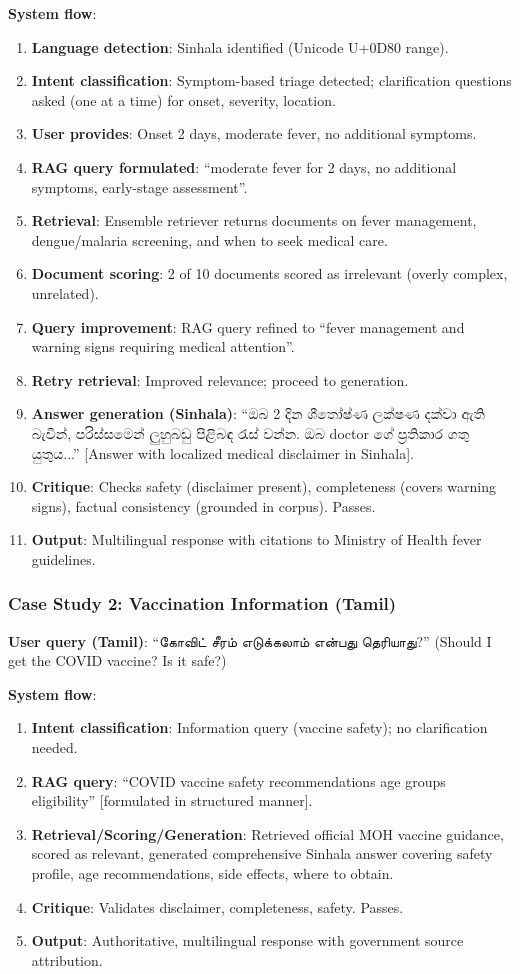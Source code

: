 \documentclass[11pt,a4paper]{article}
\begin{document}
\textbf{System flow}:
\begin{enumerate}
    \item \textbf{Language detection}: Sinhala identified (Unicode U+0D80 range).
    \item \textbf{Intent classification}: Symptom-based triage detected; clarification questions asked (one at a time) for onset, severity, location.
    \item \textbf{User provides}: Onset 2 days, moderate fever, no additional symptoms.
    \item \textbf{RAG query formulated}: ``moderate fever for 2 days, no additional symptoms, early-stage assessment''.
    \item \textbf{Retrieval}: Ensemble retriever returns documents on fever management, dengue/malaria screening, and when to seek medical care.
    \item \textbf{Document scoring}: 2 of 10 documents scored as irrelevant (overly complex, unrelated).
    \item \textbf{Query improvement}: RAG query refined to ``fever management and warning signs requiring medical attention''.
    \item \textbf{Retry retrieval}: Improved relevance; proceed to generation.
    \item \textbf{Answer generation (Sinhala)}: ``ඔබ 2 දින ශීතෝෂ්ණ ලක්ෂණ දක්වා ඇති බැවින්, පරිස්සමෙන් ලුහුබඩු පිළිබඳ රැස් වන්න. ඔබ doctor ගේ ප්‍රතිකාර ගතු යුතුය...'' [Answer with localized medical disclaimer in Sinhala].
    \item \textbf{Critique}: Checks safety (disclaimer present), completeness (covers warning signs), factual consistency (grounded in corpus). Passes.
    \item \textbf{Output}: Multilingual response with citations to Ministry of Health fever guidelines.
\end{enumerate}

\subsubsection{Case Study 2: Vaccination Information (Tamil)}
\textbf{User query (Tamil)}: ``கோவிட் சீரம் எடுக்கலாம் என்பது தெரியாது?'' (Should I get the COVID vaccine? Is it safe?)

\textbf{System flow}:
\begin{enumerate}
    \item \textbf{Intent classification}: Information query (vaccine safety); no clarification needed.
    \item \textbf{RAG query}: ``COVID vaccine safety recommendations age groups eligibility'' [formulated in structured manner].
    \item \textbf{Retrieval/Scoring/Generation}: Retrieved official MOH vaccine guidance, scored as relevant, generated comprehensive Sinhala answer covering safety profile, age recommendations, side effects, where to obtain.
    \item \textbf{Critique}: Validates disclaimer, completeness, safety. Passes.
    \item \textbf{Output}: Authoritative, multilingual response with government source attribution.
\end{enumerate}
\end{document}
